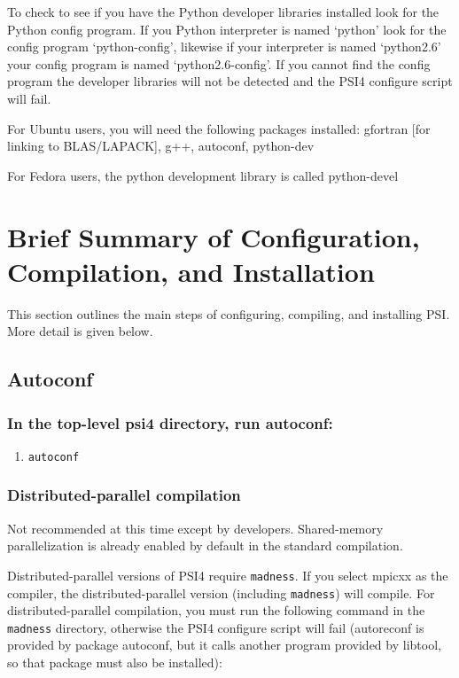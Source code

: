 \documentclass[12pt]{article}
\begin{document}
   To check to see if you have the Python developer libraries installed look
   for the Python config program. If you Python interpreter is named `python'
   look for the config program `python-config', likewise if your interpreter
   is named `python2.6' your config program is named `python2.6-config'. If
   you cannot find the config program the developer libraries will not be
   detected and the PSI4 configure script will fail.

   For Ubuntu users, you will need the following packages installed:
   gfortran [for linking to BLAS/LAPACK], g++, autoconf, python-dev

   For Fedora users, the python development library is called python-devel

\section{Brief Summary of Configuration, Compilation, and Installation}

This section outlines the main steps of configuring, compiling, and
installing PSI.  More detail is given below.

\subsection{Autoconf}
\subsubsection{In the top-level psi4 directory, run autoconf:}
\begin{enumerate}
\item {\tt autoconf}
\end{enumerate}

\subsubsection{Distributed-parallel compilation}

Not recommended at this time except by developers.  Shared-memory
parallelization is already enabled by default in the standard
compilation.

Distributed-parallel versions of PSI4 require {\tt madness}. If you select
mpicxx as the compiler, the distributed-parallel version (including
{\tt madness}) will compile. For distributed-parallel compilation, you must
run the following command in the {\tt madness} directory, otherwise the PSI4
configure script will fail (autoreconf is provided by package autoconf,
but it calls another program provided by libtool, so that package must
also be installed):
\end{document}
